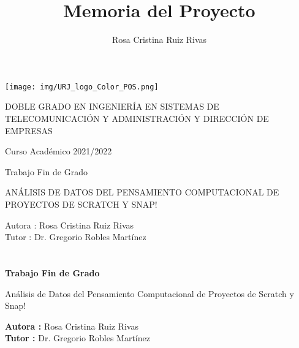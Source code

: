 \documentclass[a4paper, 12pt]{book}
\title{Memoria del Proyecto}
\author{Rosa Cristina Ruiz Rivas}
\begin{document}
\renewcommand{\refname}{Bibliografía}  %
\renewcommand{\appendixname}{Apéndice}


\begin{titlepage}
\begin{center}
\texttt{[image: img/URJ\_logo\_Color\_POS.png]}

\vspace{1.75cm}

\Large
DOBLE GRADO EN INGENIERÍA EN SISTEMAS DE TELECOMUNICACIÓN Y ADMINISTRACIÓN Y DIRECCIÓN DE EMPRESAS 

\vspace{0.4cm}

\large
Curso Académico 2021/2022

\vspace{0.8cm}

Trabajo Fin de Grado

\vspace{2.5cm}

\LARGE
ANÁLISIS DE DATOS DEL PENSAMIENTO COMPUTACIONAL DE PROYECTOS DE SCRATCH Y SNAP!

\vspace{3cm} 

\large
Autora : Rosa Cristina Ruiz Rivas \\
Tutor : Dr. Gregorio Robles Martínez
\end{center}
\end{titlepage}

\newpage
\mbox{}
\thispagestyle{empty} %


\clearpage
{}
\chapter*{}

\vspace{-4cm}
\begin{center}
\LARGE
\textbf{Trabajo Fin de Grado}

\vspace{1cm}
\large
Análisis de Datos del Pensamiento Computacional de Proyectos de Scratch y Snap!

\vspace{1cm}
\large
\textbf{Autora :} Rosa Cristina Ruiz Rivas \\
\textbf{Tutor :} Dr. Gregorio Robles Martínez

\end{center}
\end{document}
